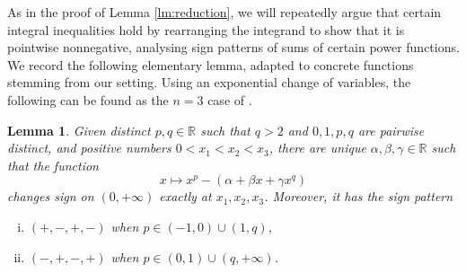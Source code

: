 \documentclass[10pt]{amsart}
\newcommand{\1}{\textbf{1}}
\newcommand{\R}{\mathbb{R}}
\newcommand{\red}{}
\newtheorem{lemma}[theorem]{Lemma}
\theoremstyle{remark}
\theoremstyle{definition}
\begin{document}
As in the proof of Lemma \ref{lm:reduction}, we will repeatedly argue that certain integral inequalities hold by rearranging the integrand to show that it is pointwise nonnegative,
 analysing sign patterns of sums of certain power functions. We record the following elementary lemma, adapted to concrete functions stemming from our setting.  
 {\red Using an exponential change of variables, the following can be found as the $n=3$ case of \cite[Lemma A.2]{Fer}.}

\begin{lemma}\label{lm:power-functions}
Given distinct $p,q \in \R$ such that $q > 2$ and $0, 1, p, q$ are pairwise distinct, and positive numbers $0 < x_1 < x_2 < x_3$, there are unique $\alpha, \beta, \gamma \in \R$ such that the function
\[ 
x \mapsto x^p - (\alpha + \beta x + \gamma x^q)
 \]
changes sign on $(0,{+\infty})$ exactly at $x_1, x_2, x_3$. Moreover, it has the sign pattern
\begin{enumerate}[(i)]
\item\label{lm:power-functions1} $(+,-,+,-)$ when $p \in (-1,0) \cup (1, q)$, 
\item\label{lm:power-functions2} $(-,+,-,+)$ when $p \in (0,1) \cup (q, {+\infty})$.
\end{enumerate}
\end{lemma}
\end{document}

